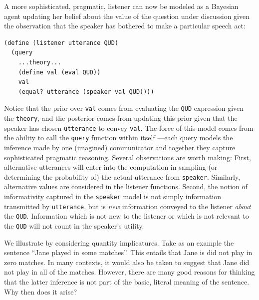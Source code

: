 \documentclass[pdfextras]{handbook}
\begin{document}
A more sophisticated, pragmatic, listener can now be modeled as a Bayesian agent updating her belief about the value of the question under discussion given the observation that the speaker has bothered to make a particular speech act:
\begin{lstlisting}
(define (listener utterance QUD)
  (query
    ...theory...
    (define val (eval QUD))
    val
    (equal? utterance (speaker val QUD))))
\end{lstlisting}
Notice that the prior over \lstinline{val} comes from evaluating the \lstinline{QUD} expression given the \lstinline{theory}, and the posterior comes from updating this prior given that the speaker has chosen \lstinline{utterance} to convey \lstinline{val}.
The force of this model comes from the ability to call the \lstinline{query} function within itself \citep{Stuhlmueller2013}---each query models the inference made by one (imagined) communicator and together they capture sophisticated pragmatic reasoning. 
Several observations are worth making: First, alternative utterances will enter into the computation in sampling (or determining the probability of) the actual utterance from \lstinline{speaker}. 
Similarly, alternative values are considered in the listener functions.
Second, the notion of informativity captured in the \lstinline{speaker} model is not simply information transmitted by \lstinline{utterance}, but is \emph{new} information conveyed to the listener \emph{about} the \lstinline{QUD}. 
Information which is not new to the listener or which is not relevant to the \lstinline{QUD} will not count in the speaker's utility.

We illustrate by considering quantity implicatures. 
Take as an example the sentence ``Jane played in some matches''. 
This entails that Jane is did not play in zero matches. 
In many contexts, it would also be taken to suggest that Jane did not play in all of the matches. 
However, there are many good reasons for thinking that the latter inference is not part of the basic, literal meaning of the sentence\citep{grice89,geurts2010quantity}. 
Why then does it arise?


\end{document}
